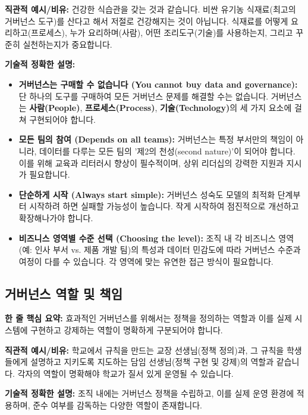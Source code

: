\documentclass[11pt,a4paper]{article}
\begin{document}
\textbf{직관적 예시/비유:}
건강한 식습관을 갖는 것과 같습니다. 비싼 유기농 식재료(최고의 거버넌스 도구)를 산다고 해서 저절로 건강해지는 것이 아닙니다. 식재료를 어떻게 요리하고(프로세스), 누가 요리하며(사람), 어떤 조리도구(기술)를 사용하는지, 그리고 꾸준히 실천하는지가 중요합니다.

\textbf{기술적 정확한 설명:}
\begin{itemize}
    \item \textbf{거버넌스는 구매할 수 없습니다 (You cannot buy data and governance):}
    단 하나의 도구를 구매하여 모든 거버넌스 문제를 해결할 수는 없습니다. 거버넌스는 \textbf{사람(People)}, \textbf{프로세스(Process)}, \textbf{기술(Technology)}의 세 가지 요소에 걸쳐 구현되어야 합니다.
    \item \textbf{모든 팀의 참여 (Depends on all teams):}
    거버넌스는 특정 부서만의 책임이 아니라, 데이터를 다루는 모든 팀의 '제2의 천성(second nature)'이 되어야 합니다. 이를 위해 교육과 리터러시 향상이 필수적이며, 상위 리더십의 강력한 지원과 지시가 필요합니다.
    \item \textbf{단순하게 시작 (Always start simple):}
    거버넌스 성숙도 모델의 최적화 단계부터 시작하려 하면 실패할 가능성이 높습니다. 작게 시작하여 점진적으로 개선하고 확장해나가야 합니다.
    \item \textbf{비즈니스 영역별 수준 선택 (Choosing the level):}
    조직 내 각 비즈니스 영역(예: 인사 부서 vs. 제품 개발 팀)의 특성과 데이터 민감도에 따라 거버넌스 수준과 여정이 다를 수 있습니다. 각 영역에 맞는 유연한 접근 방식이 필요합니다.
\end{itemize}

\newpage
\subsection*{거버넌스 역할 및 책임}

\begin{keyconceptbox}
\textbf{한 줄 핵심 요약:} 효과적인 거버넌스를 위해서는 정책을 정의하는 역할과 이를 실제 시스템에 구현하고 강제하는 역할이 명확하게 구분되어야 합니다.
\end{keyconceptbox}

\textbf{직관적 예시/비유:}
학교에서 규칙을 만드는 교장 선생님(정책 정의)과, 그 규칙을 학생들에게 설명하고 지키도록 지도하는 담임 선생님(정책 구현 및 강제)의 역할과 같습니다. 각자의 역할이 명확해야 학교가 질서 있게 운영될 수 있습니다.

\textbf{기술적 정확한 설명:}
조직 내에는 거버넌스 정책을 수립하고, 이를 실제 운영 환경에 적용하며, 준수 여부를 감독하는 다양한 역할이 존재합니다.
\end{document}
